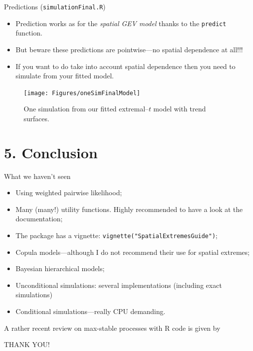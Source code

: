 \documentclass[mode=present,style=simple,paper=screen]{powerdot}
\theoremstyle{plain}%
\theoremstyle{definition}
\theoremstyle{remark}
\begin{document}
\begin{wideslide}{Predictions (\texttt{simulationFinal.R})}
  \begin{itemize}
  \item Prediction works as for the \emph{spatial GEV model} thanks to
    the \texttt{predict} function.
  \item But beware these predictions are pointwise---no spatial
    dependence at all!!!
  \item If you want to do take into account spatial dependence then
    you need to simulate from your fitted model.
  \end{itemize}
  \vspace*{-2em}
  \begin{figure}
    \centering
    \texttt{[image: Figures/oneSimFinalModel]}
    \caption{One simulation from our fitted extremal--$t$ model with trend surfaces.}
  \end{figure}
\end{wideslide}

\section{5. Conclusion}

\begin{wideslide}[toc=]{What we haven't seen}
  \begin{itemize}
  \item Using weighted pairwise likelihood;
  \item Many (many!) utility functions. Highly recommended to have a
    look at the documentation;
  \item The package has a vignette: \texttt{vignette("SpatialExtremesGuide")};
  \item Copula models---although I do not recommend their use for
    spatial extremes;
  \item Bayesian hierarchical models;
  \item Unconditional simulations: several implementations (including
    exact simulations)
  \item Conditional simulations---really CPU demanding.
  \end{itemize}
  \pause
  \HandRight{} A rather recent review on max-stable processes with R
  code is given by \citet{Ribatet2013b}
  \vfill
  \begin{center}
    \Large THANK YOU!
  \end{center}
  \vfill
\end{wideslide}
\end{document}
